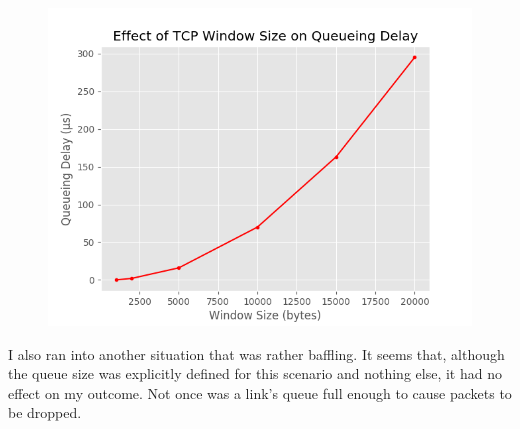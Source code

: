 \documentclass[fleqn,11pt]{article}
\begin{document}
\begin{figure}[h]
\centering
\includegraphics[width=.8\textwidth]{queueing}
\end{figure}

I also ran into another situation that was rather baffling.
It seems that, although the queue size was explicitly defined for this scenario and nothing else, it had no effect on my outcome.
Not once was a link's queue full enough to cause packets to be dropped.
\end{document}
